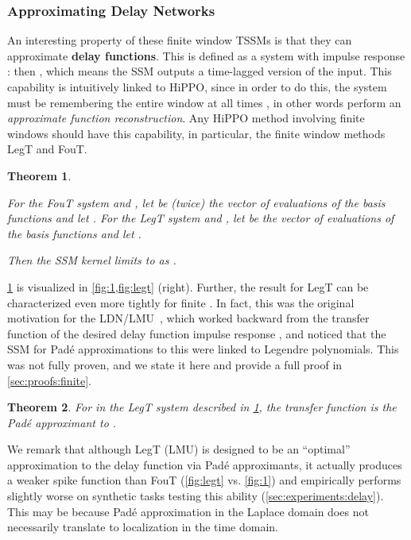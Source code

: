 \documentclass{article}
\newtheorem{theorem}{Theorem}
\begin{document}
\subsubsection{Approximating Delay Networks}
\label{sec:delay}


An interesting property of these finite window TSSMs is that they can approximate \textbf{delay functions}.
This is defined as a system with impulse response : then , which means the SSM outputs a time-lagged version of the input.
This capability is intuitively linked to HiPPO, since in order to do this, the system must be remembering the entire window  at all times , in other words perform an \emph{approximate function reconstruction}.
Any HiPPO method involving finite windows should have this capability, in particular, the finite window methods LegT and FouT.


\begin{theorem}\label{thm:delay}

For the FouT system  and , let  be (twice) the vector of evaluations of the basis functions  and let .
For the LegT system  and , let  be the vector of evaluations of the basis functions  and let .

Then the SSM kernel  limits to  as .
\end{theorem}

\cref{thm:delay} is visualized in \cref{fig:1,fig:legt} (right).
Further, the result for LegT can be characterized even more tightly for finite .
In fact, this was the original motivation for the LDN/LMU~\citep{voelker2019dynamical,voelker2019legendre},
which worked backward from the transfer function of the desired delay function impulse response ,
and noticed that the SSM for Pad\'e approximations to this were linked to Legendre polynomials.
This was not fully proven, and we state it here and provide a full proof in \cref{sec:proofs:finite}.


\begin{theorem}\label{thm:delay-legt}
  For  in the LegT system described in \cref{thm:delay}, the transfer function  is the  Pad\'e approximant to .
\end{theorem}

We remark that although LegT (LMU) is designed to be an ``optimal'' approximation to the delay function via Pad\'e approximants,
it actually produces a weaker spike function than FouT (\cref{fig:legt} vs. \cref{fig:1}) and empirically performs slightly worse on synthetic tasks testing this ability (\cref{sec:experiments:delay}).
This may be because Pad\'e approximation in the Laplace domain does not necessarily translate to localization in the time domain.
\end{document}
